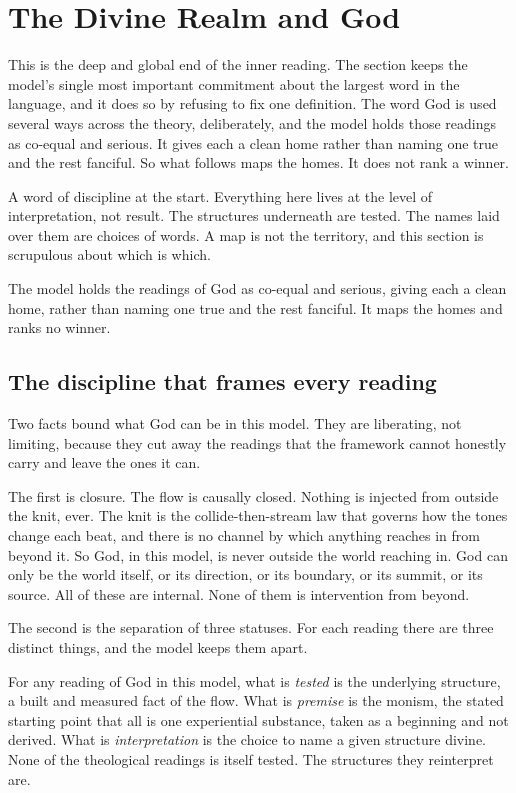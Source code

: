 \section{The Divine Realm and God}

This is the deep and global end of the inner reading. The section keeps the model's single most important commitment about the largest word in the language, and it does so by refusing to fix one definition. The word God is used several ways across the theory, deliberately, and the model holds those readings as co-equal and serious. It gives each a clean home rather than naming one true and the rest fanciful. So what follows maps the homes. It does not rank a winner.

A word of discipline at the start. Everything here lives at the level of interpretation, not result. The structures underneath are tested. The names laid over them are choices of words. A map is not the territory, and this section is scrupulous about which is which.

\begin{principle}
The model holds the readings of God as co-equal and serious, giving each a clean home, rather than naming one true and the rest fanciful. It maps the homes and ranks no winner.
\end{principle}

\subsection{The discipline that frames every reading}

Two facts bound what God can be in this model. They are liberating, not limiting, because they cut away the readings that the framework cannot honestly carry and leave the ones it can.

The first is closure. The flow is causally closed. Nothing is injected from outside the knit, ever. The knit is the collide-then-stream law that governs how the tones change each beat, and there is no channel by which anything reaches in from beyond it. So God, in this model, is never outside the world reaching in. God can only be the world itself, or its direction, or its boundary, or its summit, or its source. All of these are internal. None of them is intervention from beyond.

The second is the separation of three statuses. For each reading there are three distinct things, and the model keeps them apart.

\begin{definition}
For any reading of God in this model, what is \emph{tested} is the underlying structure, a built and measured fact of the flow. What is \emph{premise} is the monism, the stated starting point that all is one experiential substance, taken as a beginning and not derived. What is \emph{interpretation} is the choice to name a given structure divine. None of the theological readings is itself tested. The structures they reinterpret are.
\end{definition}

